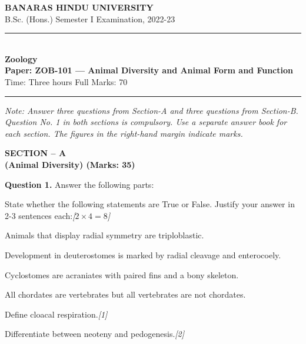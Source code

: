 \documentclass[11pt,a4paper]{article}
\newcommand{\pts}[1]{\hfill   \textit{[#1]}}
\begin{document}
\begin{center}
  {\large\bfseries BANARAS HINDU UNIVERSITY}\\[2pt]
  {\normalsize B.Sc. (Hons.) Semester I Examination, 2022-23}\\[6pt]
  \rule{0.8\linewidth}{0.5pt}\\[6pt]
  {\large\bfseries Zoology}\\[4pt]
  {\large\bfseries Paper: ZOB-101 --- Animal Diversity and Animal Form and Function}\\[4pt]
  {\normalsize Time: Three hours \hfill Full Marks: 70}
\end{center}

\rule{\linewidth}{0.4pt}

\smallskip



\noindent   \textit{Note: Answer three questions from Section-A and three questions from Section-B. Question No. 1 in both sections is compulsory. Use a separate answer book for each section. The figures in the right-hand margin indicate marks.}

\bigskip

\begin{center}
   \textbf{SECTION -- A} \\
   \textbf{(Animal Diversity) (Marks: 35)}
\end{center}

\medskip


\noindent   \textbf{Question 1.} Answer the following parts:

\begin{parts}
  \item State whether the following statements are True or False. Justify your answer in 2-3 sentences each:\pts{$2  \times 4 = 8$}
  
\begin{parts}
    \item Animals that display radial symmetry are triploblastic.
    \item Development in deuterostomes is marked by radial cleavage and enterocoely.
    \item Cyclostomes are acraniates with paired fins and a bony skeleton.
    \item All chordates are vertebrates but all vertebrates are not chordates.
  \end{parts}
  \item Define cloacal respiration.\pts{1}
  \item Differentiate between neoteny and pedogenesis.\pts{2}
\end{parts}
\end{document}
